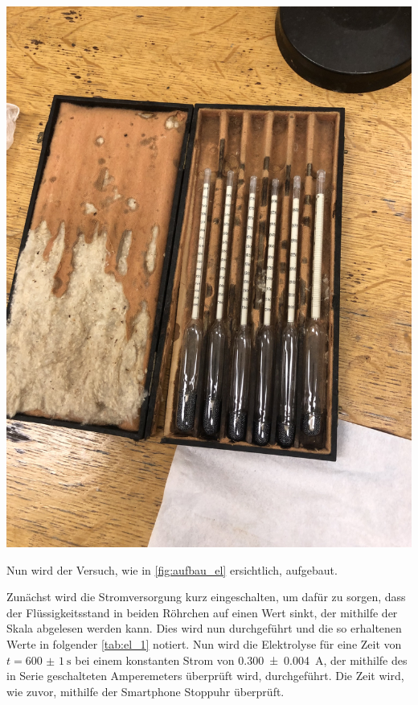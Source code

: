 \documentclass[11pt,ngerman]{scrartcl}
\begin{document}
\begin{minipage}{\textwidth}
\begin{minipage}[t]{0.49\textwidth}
		\includegraphics[angle=90,width=\textwidth]{senkspindeln}
		\label{fig:senkspindeln}
	\end{minipage}
	\vspace{1em}
\end{minipage}

Nun wird der Versuch, wie in \autoref{fig:aufbau_el} ersichtlich, aufgebaut.

Zunächst wird die Stromversorgung kurz eingeschalten, um dafür zu sorgen, dass der Flüssigkeitsstand in beiden Röhrchen auf einen Wert sinkt, der mithilfe der Skala abgelesen werden kann. Dies wird nun durchgeführt und die so erhaltenen Werte in folgender \autoref{tab:el_1} notiert. Nun wird die Elektrolyse für eine Zeit von $t=\SI{600(1)}{\s}$ bei einem konstanten Strom von \SI{0.300(4)}{A}, der mithilfe des in Serie geschalteten Amperemeters überprüft wird, durchgeführt. Die Zeit wird, wie zuvor, mithilfe der Smartphone Stoppuhr überprüft.
\end{document}
